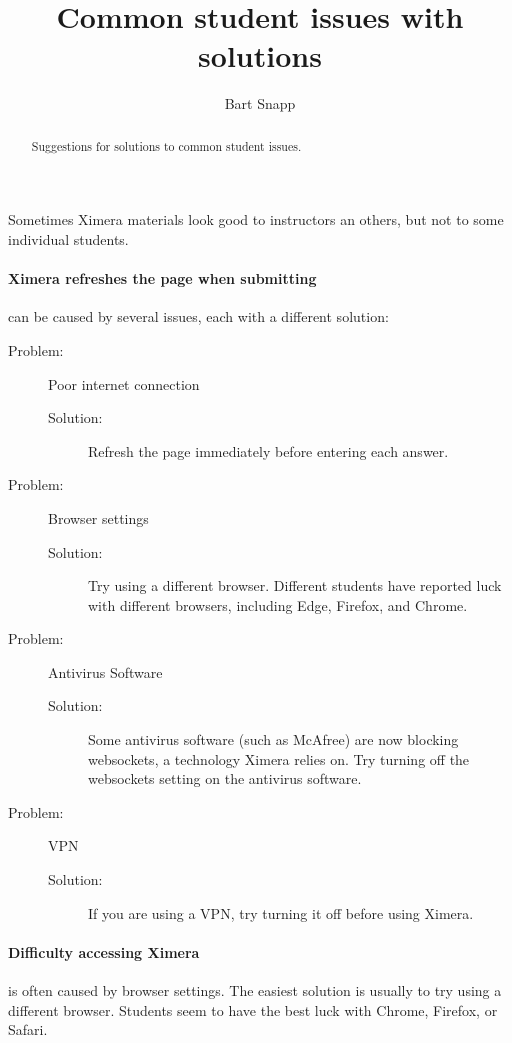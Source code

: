 \documentclass{ximera}
\title{Common student issues with solutions}
\author{Bart Snapp}
\begin{document}
\begin{abstract}
    Suggestions for solutions to common student issues.
\end{abstract}
\maketitle

Sometimes Ximera materials look good to instructors an others, but not to some
individual students.


\paragraph{Ximera refreshes the page when submitting}
can be caused by several issues, each with a different solution:
\begin{description}
\item[Problem:] Poor internet connection
\begin{description}
    \item[Solution:] Refresh the page immediately before entering each answer.
\end{description}
\item[Problem:] Browser settings
\begin{description}
    \item[Solution:] Try using a different browser. Different students have
reported luck with different browsers, including Edge, Firefox, and Chrome.
\end{description}
\item[Problem:] Antivirus Software
\begin{description}
    \item[Solution:] Some antivirus software (such as McAfree) are now blocking
websockets, a technology Ximera relies on. Try turning off the websockets setting on the antivirus software.

\end{description}
\item[Problem:] VPN
\begin{description}
    \item[Solution:] If you are using a VPN, try turning it off before using
Ximera.
\end{description}
\end{description}



\paragraph{Difficulty accessing Ximera} is often caused by browser settings. The
easiest solution is usually to try using a different browser. Students seem to
have the best luck with Chrome, Firefox, or Safari.
\end{document}
